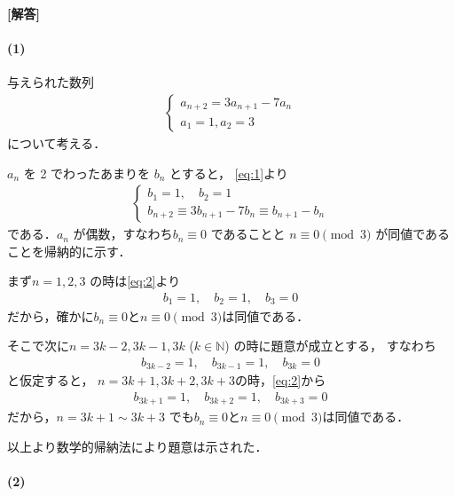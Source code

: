 \documentclass[../../main.tex]{subfiles}
\begin{document}
\begin{oframed}
  
\end{oframed}

{\bf [解答]}
\paragraph{(1)}

与えられた数列
\begin{align}
  \begin{cases}
    a_{n+2} = 3a_{n+1} - 7a_n \\
    a_1 = 1, a_2 = 3
  \end{cases} \label{eq:1}
\end{align}
について考える．

$a_n$ を 2 でわったあまりを $b_n$ とすると，
\cref{eq:1}より
\begin{align}
  \begin{cases}
    b_1 = 1, \quad b_2 = 1 \\
    b_{n+2} \equiv 3b_{n+1} - 7b_n \equiv b_{n+1} - b_n
  \end{cases} \label{eq:2}
\end{align}
である．$a_n$ が偶数，すなわち$b_n\equiv 0$ であることと $ n \equiv 0 \pmod 3$ が同値であることを帰納的に示す．

まず$n=1,2,3$ の時は\cref{eq:2}より
\begin{align}
  b_1 = 1, \quad b_2 = 1, \quad b_3 = 0
\end{align}
だから，確かに$b_n \equiv 0$と$n \equiv 0 \pmod 3$は同値である．

そこで次に$n = 3k-2, 3k-1, 3k$ ($k \in \mathbb{N}$) の時に題意が成立とする，
すなわち
\begin{align}
  b_{3k-2} = 1, \quad b_{3k-1} = 1, \quad b_{3k} = 0
\end{align}
と仮定すると，
$n=3k+1,3k+2,3k+3$の時，\cref{eq:2}から
\begin{align}
  b_{3k+1} = 1, \quad b_{3k+2} = 1, \quad b_{3k+3} = 0
\end{align}
だから，$n = 3k+1 \sim 3k+3$ でも$b_n \equiv 0$と$n \equiv 0 \pmod 3$は同値である．

以上より数学的帰納法により題意は示された．

\paragraph{(2)}
\end{document}
